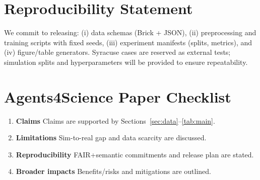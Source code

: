 \documentclass{article}
\begin{document}
\section*{Reproducibility Statement}
We commit to releasing: (i) data schemas (Brick + JSON), (ii) preprocessing and training scripts with fixed seeds, (iii) experiment manifests (splits, metrics), and (iv) figure/table generators. 
Syracuse cases are reserved as external tests; simulation splits and hyperparameters will be provided to ensure repeatability.

\section*{Agents4Science Paper Checklist}
\begin{enumerate}
\item \textbf{Claims} \quad \answerYes{} \quad Claims are supported by Sections~\ref{sec:data}--\ref{tab:main}.
\item \textbf{Limitations} \quad \answerYes{} \quad Sim-to-real gap and data scarcity are discussed.
\item \textbf{Reproducibility} \quad \answerYes{} \quad FAIR+semantic commitments and release plan are stated.
\item \textbf{Broader impacts} \quad \answerYes{} \quad Benefits/risks and mitigations are outlined.
\end{enumerate}
\end{document}

